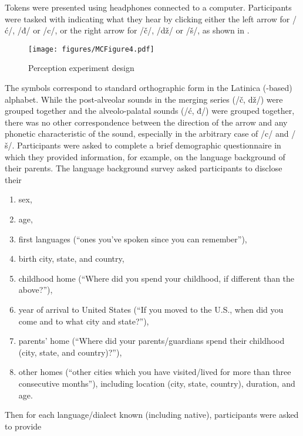 \documentclass[output=paper,modfonts,newtxmath,hidelinks,]{langscibook}
\begin{document}
Tokens were presented using headphones connected to a computer. Participants were tasked with indicating what they hear by clicking either the left arrow for /ć/, /đ/ or /c/, or the right arrow for /č/, /dž/ or /š/, as shown in .

\begin{figure}[t]
\texttt{[image: figures/MCFigure4.pdf]}
\caption{\label{fig:mihajlovic:4} Perception experiment design}
\end{figure}

The symbols correspond to standard orthographic form in the Latinica (-based) alphabet. While the post-alveolar sounds in the merging series (/č, dž/) were grouped together and the alveolo-palatal sounds (/ć, đ/) were grouped together, there was no other correspondence between the direction of the arrow and any phonetic characteristic of the sound, especially in the arbitrary case of /c/ and /š/. Participants were asked to complete a brief demographic questionnaire in which they provided information, for example, on the language background of their parents. The language background survey asked participants to disclose their

\begin{enumerate}
\item sex, 
\item age, 
\item first languages (“ones you’ve spoken since you can remember”), 
\item birth city, state, and country,
\item childhood home (“Where did you spend your childhood, if different than the above?”), 
\item year of arrival to United States (“If you moved to the U.S., when did you come and to what city and state?”), 
\item parents’ home (“Where did your parents/guardians spend their childhood (city, state, and country)?”),
\item other homes (“other cities which you have visited/lived for more than three consecutive months”), including location (city, state, country), duration, and age.
\end{enumerate}

Then for each language/dialect known (including native), participants were asked to provide 
\end{document}

